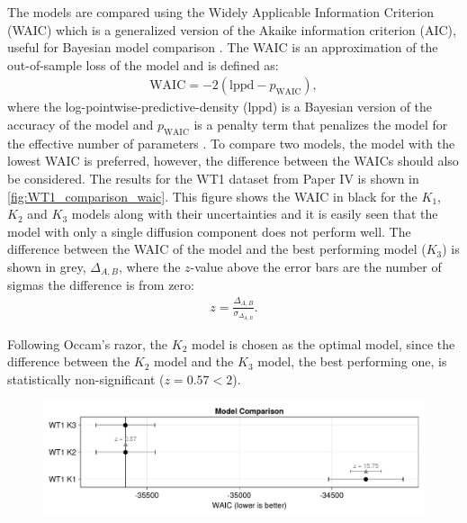 The models are compared using the Widely Applicable Information Criterion (WAIC) \parencite{watanabeAsymptoticEquivalenceBayes2010a} which is a generalized version of the Akaike information criterion (AIC), useful for Bayesian model comparison \parencite{gelmanUnderstandingPredictiveInformation2014a}. The WAIC is an approximation of the out-of-sample loss of the model and is defined as:
\begin{align}
    \mathrm{WAIC} = -2(\mathrm{lppd} - p_\mathrm{WAIC}),
\end{align}
where the log-pointwise-predictive-density ($\mathrm{lppd}$) is a Bayesian version of the accuracy of the model and $p_\mathrm{WAIC}$ is a penalty term that penalizes the model for the effective number of parameters \parencite{mcelreathStatisticalRethinkingBayesian2020}. To compare two models, the model with the lowest WAIC is preferred, however, the difference between the WAICs should also be considered. The results for the WT1 dataset from Paper IV is shown in \autoref{fig:WT1_comparison_waic}. This figure shows the WAIC in black for the $K_1$, $K_2$ and $K_3$ models along with their uncertainties and it is easily seen that the model with only a single diffusion component does not perform well. The difference between the WAIC of the model and the best performing model ($K_3$) is shown in grey, $\Delta_{A,B}$, where the $z$-value above the error bars are the number of sigmas the difference is from zero:
\begin{align}
    z = \frac{\Delta_{A,B}}{\sigma_{\Delta_{A,B}}}.
\end{align}

Following Occam's razor, the $K_2$ model is chosen as the optimal model, since the difference between the $K_2$ model and the $K_3$ model, the best performing one, is statistically non-significant ($z=0.57<2$).


\begin{figure}[htbp]
    \centering
    \includegraphics[trim={0mm 0mm 0mm 0mm}, clip, width=\textwidth]{figures/WT1_comparison_waic.pdf}
\end{figure}
